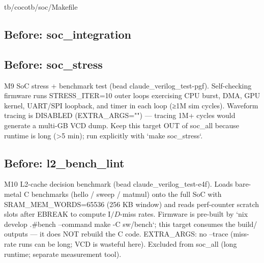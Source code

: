 \begin{relocated}{tb/cocotb/soc/Makefile}
\subsection*{Before: soc\_integration}


\subsection*{Before: soc\_stress}

\begin{textblock}
M9 SoC stress + benchmark test (bead claude_verilog_test-pgf).
Self-checking firmware runs STRESS_ITER=10 outer loops exercising CPU burst,
DMA, GPU kernel, UART/SPI loopback, and timer in each loop (≥1M sim cycles).
Waveform tracing is DISABLED (EXTRA_ARGS="") — tracing 1M+ cycles would
generate a multi-GB VCD dump.  Keep this target OUT of soc_all because
runtime is long (>5 min); run explicitly with `make soc_stress`.
\end{textblock}

\subsection*{Before: l2\_bench\_lint}

\begin{textblock}
M10 L2-cache decision benchmark (bead claude_verilog_test-e4f).
Loads bare-metal C benchmarks (hello / sweep / matmul) onto the full SoC
with SRAM_MEM_WORDS=65536 (256 KB window) and reads perf-counter scratch
slots after EBREAK to compute I$/D$-miss rates.
Firmware is pre-built by `nix develop .#bench --command make -C sw/bench`;
this target consumes the build/ outputs — it does NOT rebuild the C code.
EXTRA_ARGS: no --trace (miss-rate runs can be long; VCD is wasteful here).
Excluded from soc_all (long runtime; separate measurement tool).
\end{textblock}


\end{relocated}
